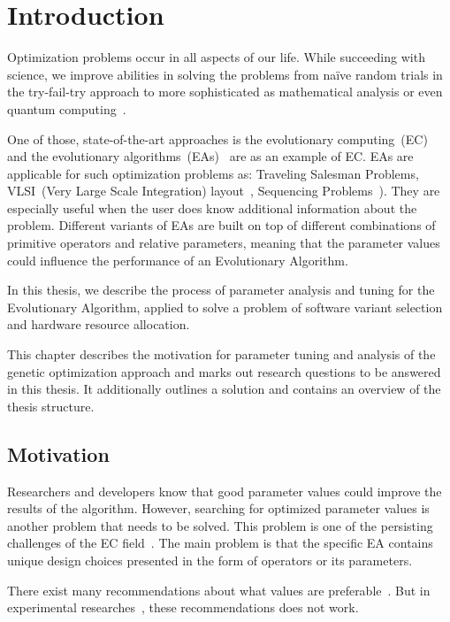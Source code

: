 \chapter{Introduction}\label{intro}

Optimization problems occur in all aspects of our life.  While succeeding with science, we improve abilities in solving the problems from naïve random trials in the try-fail-try approach to more sophisticated as mathematical analysis or even quantum computing~\cite{hogg2000quantum}.

One of those, state-of-the-art approaches is the evolutionary computing~(EC)~\cite{vikhar16} and the evolutionary algorithms~(EAs)~\cite{vikhar16} are as an example of EC. EAs are applicable for such optimization problems as: Traveling Salesman Problems\cite{carter2006new}, VLSI~(Very Large Scale Integration) layout~\cite{shahookar1990genetic}, Sequencing Problems~\cite{gockel1997influencing}). They are especially useful when the user does know additional information about the problem. Different variants of EAs are built on top of different combinations of primitive operators and relative parameters, meaning that the parameter values could influence the performance of an Evolutionary Algorithm. 

In this thesis, we describe the process of parameter analysis and tuning for the Evolutionary Algorithm, applied to solve a problem of software variant selection and hardware resource allocation.


This chapter describes the motivation for parameter tuning and analysis of the genetic optimization approach and marks out research questions to be answered in this thesis. It additionally outlines a solution and contains an overview of the thesis structure.

\section{Motivation}
Researchers and developers know that good parameter values could improve the results of the algorithm. However, searching for optimized parameter values is another problem that needs to be solved. This problem is one of the persisting challenges of the EC field~\cite{smit2010parameter}. The main problem is that the specific EA contains unique design choices presented in the form of operators or its parameters. 

There exist many recommendations about what values are preferable~\cite{de2007parameter, sipper2018investigating}.  But in experimental researches~\cite{de2007parameter, shahookar1990genetic, gockel1997influencing}, these recommendations does not work. 

